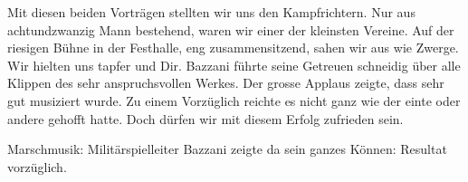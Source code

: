 \begin{history}
    Mit diesen beiden Vorträgen stellten wir uns den Kampfrichtern. Nur aus
    achtundzwanzig Mann bestehend, waren wir einer der kleinsten Vereine. Auf
    der riesigen Bühne in der Festhalle, eng zusammensitzend, sahen wir aus wie
    Zwerge. Wir hielten uns tapfer und Dir. Bazzani führte seine Getreuen
    schneidig über alle Klippen des sehr anspruchsvollen Werkes. Der grosse
    Applaus zeigte, dass sehr gut musiziert wurde. Zu einem Vorzüglich reichte
    es nicht ganz wie der einte oder andere gehofft hatte. Doch dürfen wir mit
    diesem Erfolg zufrieden sein.

    Marschmusik: Militärspielleiter Bazzani zeigte da sein ganzes Können:
    Resultat vorzüglich.

\end{history}
